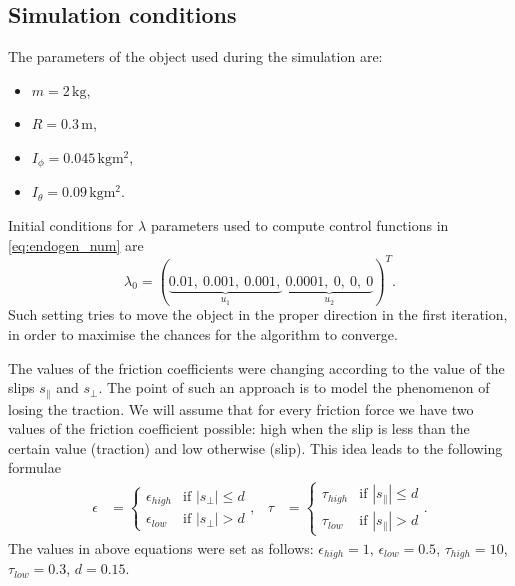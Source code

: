 \subsection{Simulation conditions}
\label{sec:discont_params_uni}
The parameters of the object used during the simulation are:
\begin{multicols}{2}
\begin{itemize}
\item $m=2 \,\mathrm{kg}$,
\item $R=0.3 \,\mathrm{m}$,
\item $I_\phi =0.045\,\mathrm{kgm^2}$,
\item $I_\theta =0.09\,\mathrm{kgm^2}$. 
\end{itemize}
\end{multicols}
Initial conditions for $\lambda$ parameters used to compute control functions
in \eqref{eq:endogen_num} are
\begin{equation}
\lambda_0=
(\underbrace{0.01, \ 0.001, \ 0.001,}_{u_1}\ \underbrace{0.0001, \ 0, \ 0, \ 0}_{u_2})^T.
\end{equation}
Such setting tries to move the object in the proper direction in the first iteration, in order to
maximise the chances for the algorithm to converge.

The values of the friction coefficients were changing according to the value of the slips $s_\parallel$
and $s_\perp$. 
The point of such an approach is to model the phenomenon
of losing the traction. We will assume that for every friction force we have two
values of the friction coefficient possible: high when the slip is less than the certain
value (traction) and low otherwise (slip). This idea leads to the following formulae
\begin{equation*}
\begin{aligned}
\epsilon&=\begin{cases}
\epsilon_{high} &\mbox{if } |s_\perp| \leq d \\
\epsilon_{low} &\mbox{if } |s_\perp| > d
\end{cases}, &
\tau&=\begin{cases}
\tau_{high} &\mbox{if } |s_\parallel| \leq d \\
\tau_{low} &\mbox{if } |s_\parallel| > d
\end{cases}.
\end{aligned}
\end{equation*}
The values in above equations were set as follows: $\epsilon_{high}=1$, $\epsilon_{low}=0.5$,
$\tau_{high}=10$, $\tau_{low}=0.3$, $d=0.15$.

